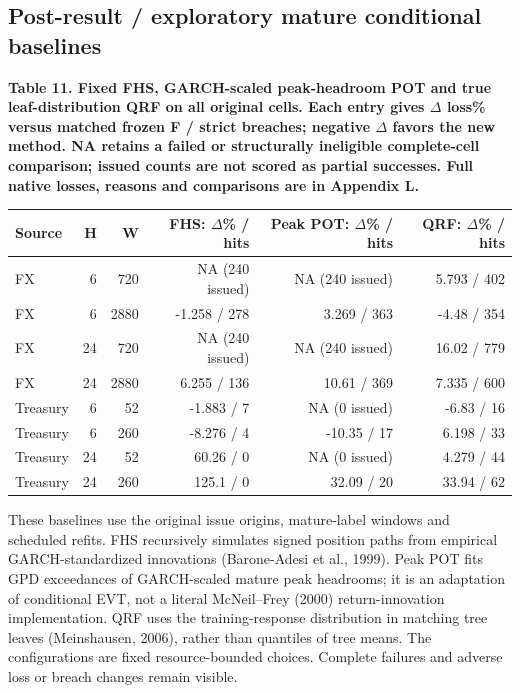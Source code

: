 \documentclass[10pt,a4paper]{article}
\begin{document}
\subsection*{Post-result / exploratory mature conditional baselines}
\begin{center}
\begin{minipage}{\linewidth}
\small\textbf{Table 11. Fixed FHS, GARCH-scaled peak-headroom POT and true leaf-distribution QRF on all original cells. Each entry gives \(\Delta\) loss\% versus matched frozen F / strict breaches; negative \(\Delta\) favors the new method. NA retains a failed or structurally ineligible complete-cell comparison; issued counts are not scored as partial successes. Full native losses, reasons and comparisons are in Appendix L.}\par\medskip
\centering\fontsize{8}{10}\selectfont
\begin{tabular}{lrrrrr}
\toprule
Source & H & W & FHS: \(\Delta\)\% / hits & Peak POT: \(\Delta\)\% / hits & QRF: \(\Delta\)\% / hits \\
\midrule
FX & 6 & 720 & NA (240 issued) & NA (240 issued) & 5.793 / 402 \\
FX & 6 & 2880 & -1.258 / 278 & 3.269 / 363 & -4.48 / 354 \\
FX & 24 & 720 & NA (240 issued) & NA (240 issued) & 16.02 / 779 \\
FX & 24 & 2880 & 6.255 / 136 & 10.61 / 369 & 7.335 / 600 \\
Treasury & 6 & 52 & -1.883 / 7 & NA (0 issued) & -6.83 / 16 \\
Treasury & 6 & 260 & -8.276 / 4 & -10.35 / 17 & 6.198 / 33 \\
Treasury & 24 & 52 & 60.26 / 0 & NA (0 issued) & 4.279 / 44 \\
Treasury & 24 & 260 & 125.1 / 0 & 32.09 / 20 & 33.94 / 62 \\
\bottomrule
\end{tabular}
\end{minipage}
\end{center}
These baselines use the original issue origins, mature-label windows and scheduled refits. FHS recursively simulates signed position paths from empirical GARCH-standardized innovations (Barone-Adesi et al., 1999). Peak POT fits GPD exceedances of GARCH-scaled mature peak headrooms; it is an adaptation of conditional EVT, not a literal McNeil--Frey (2000) return-innovation implementation. QRF uses the training-response distribution in matching tree leaves (Meinshausen, 2006), rather than quantiles of tree means. The configurations are fixed resource-bounded choices. Complete failures and adverse loss or breach changes remain visible.
\end{document}
